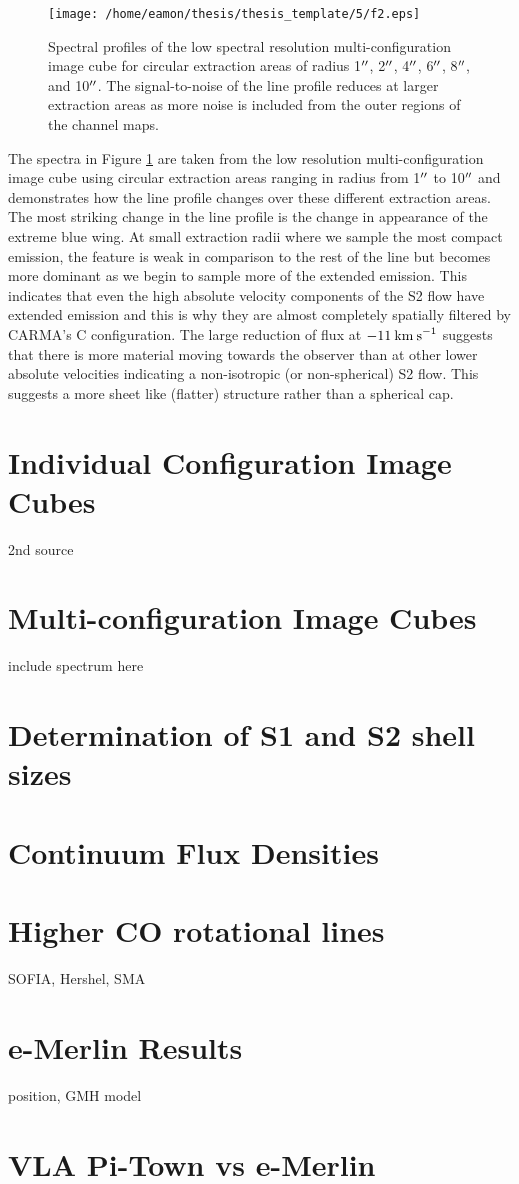 \begin{figure}[!ht]
\centering 
\texttt{[image: /home/eamon/thesis/thesis\_template/5/f2.eps]}
\caption{Spectral profiles of the low spectral resolution multi-configuration image cube for circular extraction areas of radius 1$^{\prime\prime}$, 2$^{\prime\prime}$, 4$^{\prime\prime}$, 6$^{\prime\prime}$, 8$^{\prime\prime}$, and 10$^{\prime\prime}$. The signal-to-noise of the line profile reduces at larger extraction areas as more noise is included from the outer regions of the channel maps.}
\label{fig:5.5}
\end{figure}

The spectra in Figure \ref{fig:5.5} are taken from the low resolution multi-configuration image cube using circular extraction areas ranging in radius from 1$^{\prime\prime}$ to 10$^{\prime\prime}$ and demonstrates how the line profile changes over these different extraction areas. The most striking change in the line profile is the change in appearance of the extreme blue wing. At small extraction radii where we sample the most compact emission, the feature is weak in comparison to the rest of the line but becomes more dominant as we begin to sample more of the extended emission. This indicates that even the high absolute velocity components of the S2 flow have extended emission and this is why they are almost completely spatially filtered by CARMA's C configuration. The large reduction of flux at $-11\>{\rm km\>s}^{-1}$ suggests that there is more material moving towards the observer than at other lower absolute velocities indicating a non-isotropic (or non-spherical) S2 flow. This suggests a more sheet like (flatter) structure rather than a spherical cap.

\section{Individual Configuration Image Cubes}\label{sec:5.4}
2nd source
\section{Multi-configuration Image Cubes}\label{sec:5.5}
include  spectrum here
\section{Determination of S1 and S2 shell sizes}\label{sec:5.6} 
\section{Continuum Flux Densities}\label{sec:5.7}
\section{Higher CO rotational lines}\label{sec:5.8}
SOFIA, Hershel, SMA
\section{e-Merlin Results}\label{sec:5.8}
position, GMH model
\section{VLA Pi-Town vs e-Merlin}\label{sec:5.9}